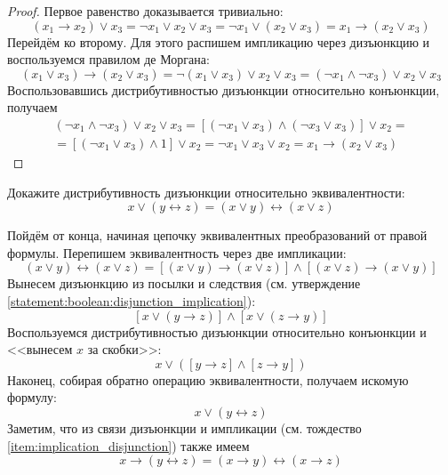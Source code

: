 \begin{proof}
    Первое равенство доказывается тривиально:
    \[
        (x_1 \rightarrow x_2) \vee x_3 = \neg x_1 \vee x_2 \vee x_3 = \neg x_1 \vee (x_2 \vee x_3) = x_1 \rightarrow (x_2 \vee x_3)
    \]
    Перейдём ко второму.
    Для этого распишем импликацию через дизъюнкцию и воспользуемся правилом де Моргана:
    \[
        (x_1 \vee x_3) \rightarrow (x_2 \vee x_3) =
        \neg (x_1 \vee x_3) \vee x_2 \vee x_3 =
        (\neg x_1 \wedge \neg x_3) \vee x_2 \vee x_3
    \]
    Воспользовавшись дистрибутивностью дизъюнкции относительно конъюнкции, получаем
    \begin{multline*}
        (\neg x_1 \wedge \neg x_3) \vee x_2 \vee x_3 =
        \left[ (\neg x_1 \vee x_3) \wedge (\neg x_3 \vee x_3) \right] \vee x_2 = \\ =
        \left[ (\neg x_1 \vee x_3) \wedge 1 \right] \vee x_2 =
        \neg x_1 \vee x_3 \vee x_2 =
        x_1 \rightarrow (x_2 \vee x_3)
    \end{multline*}
\end{proof}

\begin{Exercise}[counter=SecExercise, label={ex:boolean:disjunction_distributivity_over_equivalence}]
    \noindent
    Докажите дистрибутивность дизъюнкции относительно эквивалентности:
    \[
        x \vee (y \leftrightarrow z) = (x \vee y) \leftrightarrow (x \vee z)
    \]
\end{Exercise}

\begin{Answer}
    \noindent
    Пойдём от конца, начиная цепочку эквивалентных преобразований от правой формулы.
    Перепишем эквивалентность через две импликации:
    \[
        (x \vee y) \leftrightarrow (x \vee z) = \left[ (x \vee y) \rightarrow (x \vee z) \right] \wedge \left[ (x \vee z) \rightarrow (x \vee y) \right]
    \]
    Вынесем дизъюнкцию из посылки и следствия (см. утверждение \ref{statement:boolean:disjunction_implication}):
    \[
        \left[ x \vee \left( y \rightarrow z \right) \right] \wedge \left[ x \vee \left( z \rightarrow y \right) \right]
    \]
    Воспользуемся дистрибутивностью дизъюнкции относительно конъюнкции и <<вынесем $ x $ за скобки>>:
    \[
        x \vee \left( \left[ y \rightarrow z \right] \wedge \left[ z \rightarrow y \right] \right)
    \]
    Наконец, собирая обратно операцию эквивалентности, получаем искомую формулу:
    \[
        x \vee (y \leftrightarrow z)
    \]
    Заметим, что из связи дизъюнкции и импликации (см. тождество \ref{item:implication_disjunction}) также имеем
    \[
        x \rightarrow (y \leftrightarrow z) = (x \rightarrow y) \leftrightarrow (x \rightarrow z)
    \]
\end{Answer}


